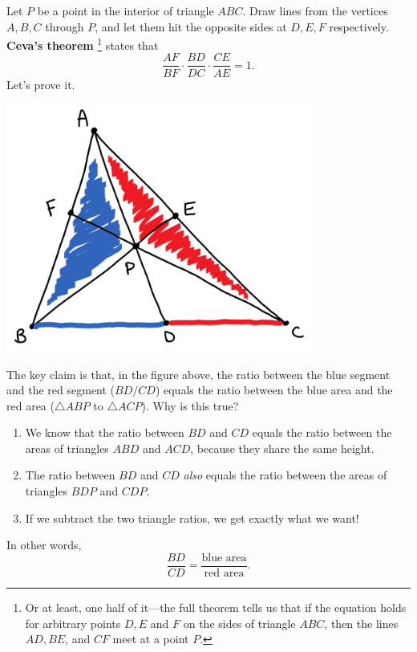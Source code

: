 \documentclass{article}
\begin{document}
Let $P$ be a point in the interior of triangle $ABC$. Draw lines from the vertices $A, B, C$ through $P$, and let them hit the opposite sides at $D, E, F$ respectively. \textbf{Ceva's theorem} \footnote{Or at least, one half of it—the full theorem tells us that if the equation holds for arbitrary points $D, E$ and $F$ on the sides of triangle $ABC$, then the lines $AD, BE$, and $CF$ meet at a point $P$.} states that
$$\dfrac{AF}{BF} \cdot \dfrac{BD}{DC} \cdot \dfrac{CE}{AE} = 1.$$
Let's prove it.
\begin{center}
    \includegraphics[width=4in]{images/triangle_areas/part_2/ceva_fig1.png}
\end{center}
The key claim is that, in the figure above, the ratio between the blue segment and the red segment ($BD/CD$) equals the ratio between the blue area and the red area ($\triangle ABP$ to $\triangle ACP$). Why is this true?
\begin{enumerate}
    \item We know that the ratio between $BD$ and $CD$ equals the ratio between the areas of triangles $ABD$ and $ACD$, because they share the same height.
    \item The ratio between $BD$ and $CD$ \textit{also} equals the ratio between the areas of triangles $BDP$ and $CDP$.
    \item If we subtract the two triangle ratios, we get exactly what we want!
\end{enumerate}

In other words,
$$\frac{BD}{CD} = \frac{\text{blue area}}{\text{red area}}.$$
\end{document}
